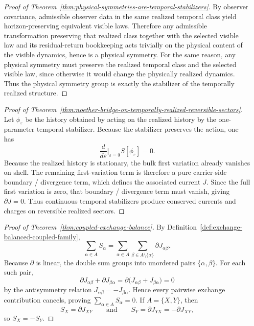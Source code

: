 \begin{proof}[Proof of Theorem~\ref{thm:physical-symmetries-are-temporal-stabilizers}]
\label{proof:thm:physical-symmetries-are-temporal-stabilizers}
By observer covariance, admissible observer data in the same realized temporal
class yield horizon-preserving equivalent visible laws. Therefore any
admissible transformation preserving that realized class together with the
selected visible law and its residual-return bookkeeping acts trivially on the
physical content of the visible dynamics, hence is a physical symmetry. For the
same reason, any physical symmetry must preserve the realized temporal class
and the selected visible law, since otherwise it would change the physically
realized dynamics. Thus the physical symmetry group is exactly the stabilizer
of the temporally realized structure.
\end{proof}

\begin{proof}[Proof of Theorem~\ref{thm:noether-bridge-on-temporally-realized-reversible-sectors}]
\label{proof:thm:noether-bridge-on-temporally-realized-reversible-sectors}
Let \(\phi_\varepsilon\) be the history obtained by acting on the realized
history by the one-parameter temporal stabilizer. Because the stabilizer
preserves the action, one has
\[
\frac{d}{d\varepsilon}\Big|_{\varepsilon=0} S[\phi_\varepsilon] = 0.
\]
Because the realized history is stationary, the bulk first variation already
vanishes on shell. The remaining first-variation term is therefore a pure
carrier-side boundary / divergence term, which defines the associated current
\(J\). Since the full first variation is zero, that boundary / divergence term
must vanish, giving \(\partial J = 0\). Thus continuous temporal stabilizers
produce conserved currents and charges on reversible realized sectors.
\end{proof}

\begin{proof}[Proof of Theorem~\ref{thm:coupled-exchange-balance}]
\label{proof:thm:coupled-exchange-balance}
By Definition~\ref{def:exchange-balanced-coupled-family},
\[
\sum_{\alpha\in A} S_\alpha
=
\sum_{\alpha\in A}\sum_{\beta\in A\setminus\{\alpha\}}\partial J_{\alpha\beta}.
\]
Because \(\partial\) is linear, the double sum groups into unordered pairs
\(\{\alpha,\beta\}\). For each such pair,
\[
\partial J_{\alpha\beta}+\partial J_{\beta\alpha}
=
\partial\bigl(J_{\alpha\beta}+J_{\beta\alpha}\bigr)
=
0
\]
by the antisymmetry relation \(J_{\alpha\beta}=-J_{\beta\alpha}\). Hence every
pairwise exchange contribution cancels, proving
\(\sum_{\alpha\in A}S_\alpha=0\). If \(A=\{X,Y\}\), then
\[
S_X=\partial J_{XY}
\qquad\text{and}\qquad
S_Y=\partial J_{YX}=-\partial J_{XY},
\]
so \(S_X=-S_Y\).
\end{proof}

